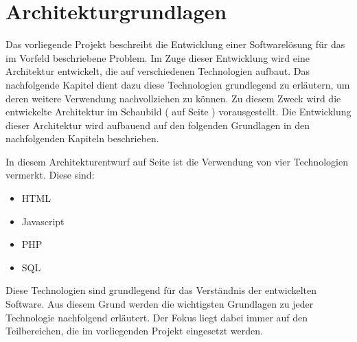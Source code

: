\section{Architekturgrundlagen}
\label{sec:Architekturgrundlagen}

Das vorliegende Projekt beschreibt die Entwicklung einer Softwarelösung für das im Vorfeld beschriebene Problem.
Im Zuge dieser Entwicklung wird eine Architektur entwickelt, die auf verschiedenen Technologien aufbaut.
Das nachfolgende Kapitel dient dazu diese Technologien grundlegend zu erläutern, um deren weitere Verwendung
nachvollziehen zu können. Zu diesem Zweck wird die entwickelte Architektur im Schaubild ( auf Seite \pageref{fig:Architektur}) vorausgestellt.
Die Entwicklung dieser Architektur wird aufbauend auf den folgenden Grundlagen in den nachfolgenden Kapiteln beschrieben.

In diesem Architekturentwurf auf Seite \pageref{fig:Architektur} ist die Verwendung von vier Technologien vermerkt. Diese sind:
\begin{itemize}
  \item HTML
  \item Javascript
  \item PHP
  \item SQL
\end{itemize}

Diese Technologien sind grundlegend für das Verständnis der entwickelten Software.
Aus diesem Grund werden die wichtigsten Grundlagen zu jeder Technologie nachfolgend erläutert.
Der Fokus liegt dabei immer auf den Teilbereichen, die im vorliegenden Projekt eingesetzt werden.